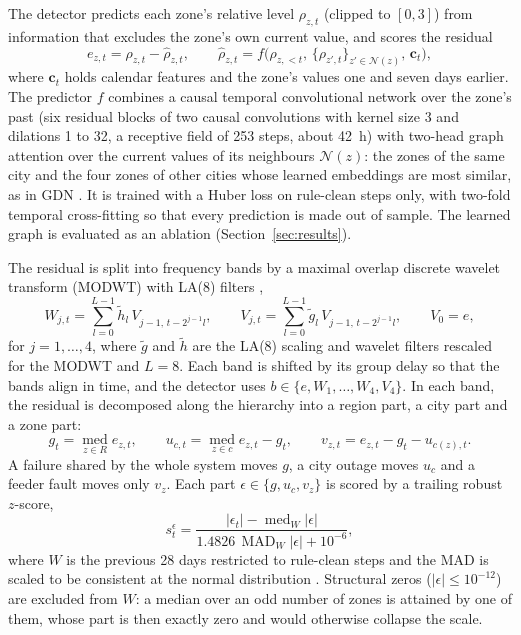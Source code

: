 The detector predicts each zone's relative level $\rho_{z,t}$ (clipped to $[0, 3]$) from information that excludes the zone's own current value, and scores the residual
\begin{equation}
e_{z,t} = \rho_{z,t} - \hat{\rho}_{z,t}, \qquad \hat{\rho}_{z,t} = f\big(\rho_{z,<t},\, \{\rho_{z',t}\}_{z' \in \mathcal{N}(z)},\, \mathbf{c}_t\big),
\label{eq:residual}
\end{equation}
where $\mathbf{c}_t$ holds calendar features and the zone's values one and seven days earlier. The predictor $f$ combines a causal temporal convolutional network \cite{bai2018tcn} over the zone's past (six residual blocks of two causal convolutions with kernel size 3 and dilations 1 to 32, a receptive field of 253 steps, about 42~h) with two-head graph attention \cite{velickovic2018gat} over the current values of its neighbours $\mathcal{N}(z)$: the zones of the same city and the four zones of other cities whose learned embeddings are most similar, as in GDN \cite{deng2021gdn}. It is trained with a Huber loss \cite{huber1964} on rule-clean steps only, with two-fold temporal cross-fitting so that every prediction is made out of sample. The learned graph is evaluated as an ablation (Section~\ref{sec:results}).

The residual is split into frequency bands by a maximal overlap discrete wavelet transform (MODWT) with LA(8) filters \cite{percival2000wavelet},
\begin{equation}
W_{j,t} = \sum_{l=0}^{L-1} \tilde{h}_l\, V_{j-1,\, t-2^{j-1} l}, \qquad V_{j,t} = \sum_{l=0}^{L-1} \tilde{g}_l\, V_{j-1,\, t-2^{j-1} l}, \qquad V_{0} = e,
\label{eq:modwt}
\end{equation}
for $j = 1, \dots, 4$, where $\tilde{g}$ and $\tilde{h}$ are the LA(8) scaling and wavelet filters rescaled for the MODWT and $L = 8$. Each band is shifted by its group delay so that the bands align in time, and the detector uses $b \in \{e, W_1, \dots, W_4, V_4\}$. In each band, the residual is decomposed along the hierarchy into a region part, a city part and a zone part:
\begin{equation}
g_t = \operatorname*{med}_{z \in R} e_{z,t}, \qquad u_{c,t} = \operatorname*{med}_{z \in c} e_{z,t} - g_t, \qquad v_{z,t} = e_{z,t} - g_t - u_{c(z),t}.
\label{eq:hierarchy}
\end{equation}
A failure shared by the whole system moves $g$, a city outage moves $u_c$ and a feeder fault moves only $v_z$. Each part $\epsilon \in \{g, u_c, v_z\}$ is scored by a trailing robust $z$-score,
\begin{equation}
s_t^{\epsilon} = \frac{|\epsilon_t| - \operatorname{med}_{W}|\epsilon|}{1.4826\, \operatorname{MAD}_{W}|\epsilon| + 10^{-6}},
\label{eq:score}
\end{equation}
where $W$ is the previous 28 days restricted to rule-clean steps and the MAD is scaled to be consistent at the normal distribution \cite{rousseeuw1993mad}. Structural zeros ($|\epsilon| \leq 10^{-12}$) are excluded from $W$: a median over an odd number of zones is attained by one of them, whose part is then exactly zero and would otherwise collapse the scale. %

